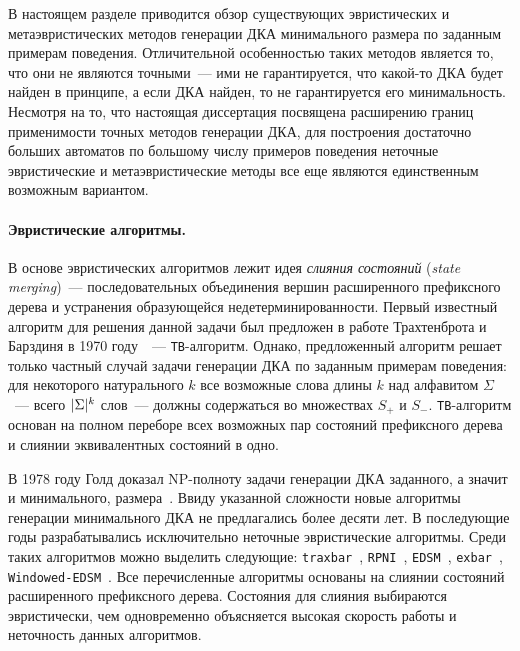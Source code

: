В настоящем разделе приводится обзор существующих эвристических и метаэвристических методов генерации ДКА минимального размера по заданным примерам поведения.
Отличительной особенностью таких методов является то, что они не являются точными~--- ими не гарантируется, что какой-то ДКА будет найден в принципе, а если ДКА найден, то не гарантируется его минимальность.
Несмотря на то, что настоящая диссертация посвящена расширению границ применимости точных методов генерации ДКА, для построения достаточно больших автоматов по большому числу примеров поведения неточные эвристические и метаэвристические методы все еще являются единственным возможным вариантом.

\paragraph*{Эвристические алгоритмы.}
\label{sec:review:heuristic-dfa-inf:heuristic}
В основе эвристических алгоритмов лежит идея \emph{слияния состояний} (\emph{state merging})~--- последовательных объединения вершин расширенного префиксного дерева и устранения образующейся недетерминированности.
Первый известный алгоритм для решения данной задачи был предложен в работе Трахтенброта и Барздиня в 1970 году~\cite{trakhtenbrot-1973-modeling}~--- \texttt{TB}-алгоритм.
Однако, предложенный алгоритм решает только частный случай задачи генерации ДКА по заданным примерам поведения: для некоторого натурального $k$ все возможные слова длины $k$ над алфавитом $\Sigma$~--- всего $\lvert\Sigma\rvert^{k}$ слов~--- должны содержаться во множествах $S_{+}$ и $S_{-}$.
\texttt{TB}-алгоритм основан на полном переборе всех возможных пар состояний префиксного дерева и слиянии эквивалентных состояний в одно.

В 1978 году Голд доказал NP-полноту задачи генерации ДКА заданного, а значит и минимального, размера~\cite{DBLP:journals/iandc/Gold78}.
Ввиду указанной сложности новые алгоритмы генерации минимального ДКА не предлагались более десяти лет.
В последующие годы разрабатывались исключительно неточные эвристические алгоритмы.
Среди таких алгоритмов можно выделить следующие: \texttt{traxbar}~\cite{DBLP:conf/colt/Lang92}, \texttt{RPNI}~\cite{oncina-rpni-1992}, \texttt{EDSM}~\cite{DBLP:conf/icgi/LangPP98}, \texttt{exbar}~\cite{lang-1999-faster}, \texttt{Windowed-EDSM}~\cite{DBLP:conf/icgi/CicchelloK02}.
Все перечисленные алгоритмы основаны на слиянии состояний расширенного префиксного дерева.
Состояния для слияния выбираются эвристически, чем одновременно объясняется высокая скорость работы и неточность данных алгоритмов.

